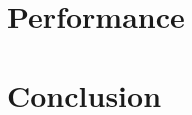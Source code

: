 \documentclass[a4paper,10pt]{article}
\begin{document}

\section{Performance\label{sec:performance}}


\section{Conclusion}
	



\end{document}
